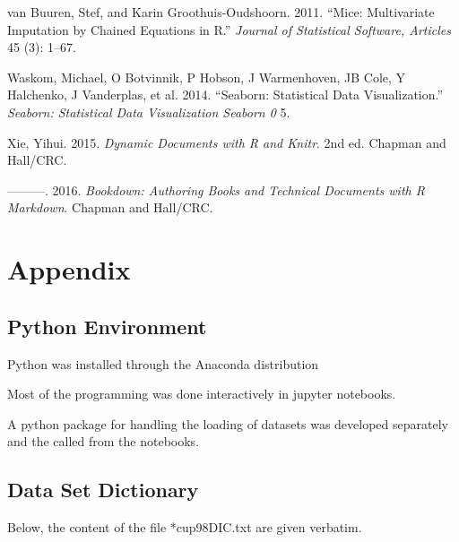 \documentclass[
  11pt,
  a4paper,
  DIV=12,captions=tableheading,oneside,titlepage=firstiscover,abstracton]{scrreprt}
\begin{document}
\leavevmode\hypertarget{ref-buuren2011mice}{}%
van Buuren, Stef, and Karin Groothuis-Oudshoorn. 2011. ``Mice: Multivariate Imputation by Chained Equations in R.'' \emph{Journal of Statistical Software, Articles} 45 (3): 1--67.

\leavevmode\hypertarget{ref-waskom2014seaborn}{}%
Waskom, Michael, O Botvinnik, P Hobson, J Warmenhoven, JB Cole, Y Halchenko, J Vanderplas, et al. 2014. ``Seaborn: Statistical Data Visualization.'' \emph{Seaborn: Statistical Data Visualization Seaborn 0} 5.

\leavevmode\hypertarget{ref-xie2015}{}%
Xie, Yihui. 2015. \emph{Dynamic Documents with R and Knitr}. 2nd ed. Chapman and Hall/CRC.

\leavevmode\hypertarget{ref-xie2016bookdown}{}%
---------. 2016. \emph{Bookdown: Authoring Books and Technical Documents with R Markdown}. Chapman and Hall/CRC.

\hypertarget{appendix}{%
\chapter{Appendix}\label{appendix}}

\hypertarget{python-environment}{%
\section{Python Environment}\label{python-environment}}

Python was installed through the Anaconda distribution

Most of the programming was done interactively in jupyter notebooks.

A python package for handling the loading of datasets was developed separately and the called from the notebooks.

\hypertarget{data-set-dictionary}{%
\section{Data Set Dictionary}\label{data-set-dictionary}}

Below, the content of the file *cup98DIC.txt are given verbatim.
\end{document}
